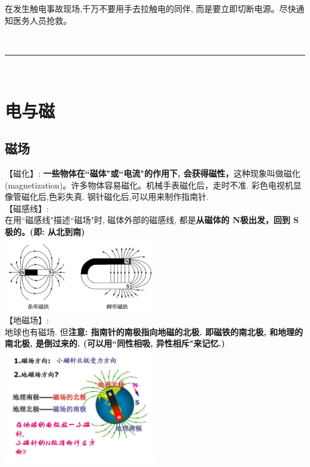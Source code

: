 \documentclass[UTF8]{ctexart}
\begin{document}
在发生触电事故现场,千万不要用手去拉触电的同伴, 而是要立即切断电源。尽快通知医务人员抢救。


~\\
\hrule
~\\



\section{电与磁}

\subsection{磁场}

【磁化】: \textbf{一些物体在``磁体"或``电流"的作用下, 会获得磁性，}这种现象叫做磁化(magnetization)。许多物体容易磁化。机械手表磁化后，走时不准. 彩色电视机显像管磁化后,色彩失真. 钢针磁化后,可以用来制作指南针. \\

【磁感线】: \\
在用``磁感线"描述``磁场"时, 磁体外部的磁感线, 都是\textbf{从磁体的 N极出发，回到 S极的。(即: 从北到南)}\\
	\includegraphics[width=0.5\textwidth]{img/0079.png} \\
	
【地磁场】:\\
地球也有磁场. 但\textbf{注意: 指南针的南极指向地磁的北极. 即磁铁的南北极, 和地理的南北极, 是倒过来的. (可以用``同性相吸, 异性相斥"来记忆.)} \\
	\includegraphics[width=0.5\textwidth]{img/0080.png} \\
\end{document}

